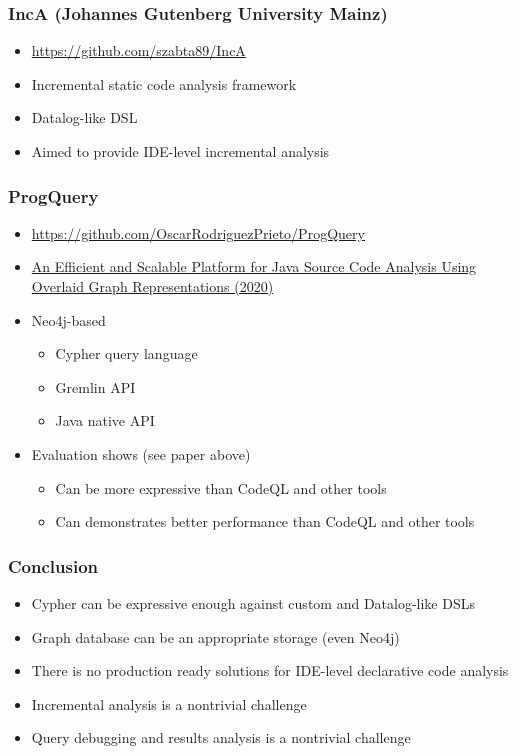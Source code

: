 \documentclass[xcolor=table,aspectratio=169]{beamer}
\begin{document}
\begin{frame}[fragile]
  \frametitle{IncA (Johannes Gutenberg University Mainz)} 
  \begin{itemize}
    \item \url{https://github.com/szabta89/IncA}
    \item Incremental static code analysis framework
    \item Datalog-like DSL
    \item Aimed to provide IDE-level incremental analysis
  \end{itemize}
\end{frame}

\begin{frame}[fragile]
  \frametitle{ProgQuery}
  \begin{itemize}
    \item \url{https://github.com/OscarRodriguezPrieto/ProgQuery}
    \item \href{https://ieeexplore.ieee.org/stamp/stamp.jsp?tp=&arnumber=9064792}{An Efficient and Scalable Platform for Java Source Code Analysis Using Overlaid Graph Representations (2020)}
    \item Neo4j-based
    \begin{itemize}
      \item Cypher query language
      \item Gremlin API
      \item Java native API
    \end{itemize}
    \item Evaluation shows (see paper above)
    \begin{itemize}
      \item Can be more expressive than CodeQL and other tools
      \item Can demonstrates better performance than CodeQL and other tools
    \end{itemize} 
  \end{itemize}
\end{frame}

\begin{frame}[fragile]
  \frametitle{Conclusion}   
  \begin{itemize}
    \item Cypher can be expressive enough against custom and Datalog-like DSLs
    \pause
    \item Graph database can be an appropriate storage (even Neo4j)
    \pause
    \item There is no production ready solutions for IDE-level declarative code analysis
    \pause
    \item Incremental analysis is a nontrivial challenge
    \pause
    \item Query debugging and results analysis is a nontrivial challenge 
  \end{itemize}
\end{frame}
\end{document}
